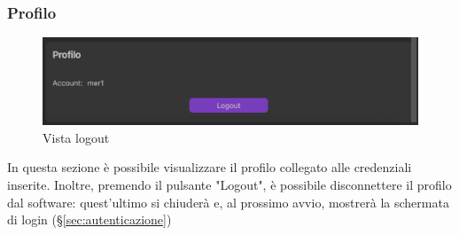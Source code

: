 \subsubsection{Profilo}
\label{sec:profilo}
\begin{figure}[H]
    \centering
    \includegraphics[scale = 0.65]{components/img/ImpLogout.png}
    \caption{Vista logout}
    \label{fig:fileRem}
\end{figure}
In questa sezione è possibile visualizzare il profilo collegato alle credenziali inserite. Inoltre, premendo il pulsante "Logout", è possibile disconnettere il profilo dal software: quest'ultimo si chiuderà e, al prossimo avvio, mostrerà la schermata di login (\S{}\ref{sec:autenticazione})

